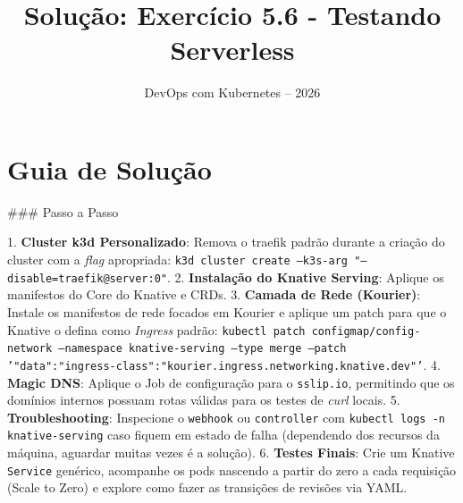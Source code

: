 \documentclass[11pt,a4paper]{article}
\title{\color{secondary}\Huge\textbf{Solução: Exercício 5.6 - Testando Serverless}}
\author{\color{primary}DevOps com Kubernetes -- 2026}
\date{}
\begin{document}
\maketitle

\section*{\color{primary}Guia de Solução}
\begin{tcolorbox}[colback=green!5!white,colframe=green!60!black,title=Resolução Passo a Passo]
### Passo a Passo

1. \textbf{Cluster k3d Personalizado}: Remova o traefik padrão durante a criação do cluster com a \textit{flag} apropriada: \texttt{k3d cluster create --k3s-arg "--disable=traefik@server:0"}.
2. \textbf{Instalação do Knative Serving}: Aplique os manifestos do Core do Knative e CRDs. 
3. \textbf{Camada de Rede (Kourier)}: Instale os manifestos de rede focados em Kourier e aplique um patch para que o Knative o defina como \textit{Ingress} padrão: \texttt{kubectl patch configmap/config-network --namespace knative-serving --type merge --patch '{"data":{"ingress-class":"kourier.ingress.networking.knative.dev"}}'}.
4. \textbf{Magic DNS}: Aplique o Job de configuração para o \texttt{sslip.io}, permitindo que os domínios internos possuam rotas válidas para os testes de \textit{curl} locais.
5. \textbf{Troubleshooting}: Inspecione o \texttt{webhook} ou \texttt{controller} com \texttt{kubectl logs -n knative-serving} caso fiquem em estado de falha (dependendo dos recursos da máquina, aguardar muitas vezes é a solução).
6. \textbf{Testes Finais}: Crie um Knative \texttt{Service} genérico, acompanhe os pods nascendo a partir do zero a cada requisição (Scale to Zero) e explore como fazer as transições de revisões via YAML.
\end{tcolorbox}
\end{document}
